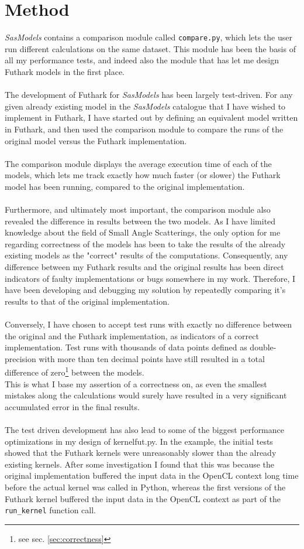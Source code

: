 \documentclass[11pt]{article}
\newcommand{\sasmodels}{\textit{SasModels}}
\begin{document}
\section{Method}
\sasmodels{} contains a comparison module called \texttt{compare.py}, which
lets the user run different calculations on the same dataset.
This module has been the basis of all my performance tests, and indeed also
the module that has let me design Futhark models in the first place.
\\\\
The development of Futhark for \sasmodels{} has been largely test-driven.
For any given already existing model in the \sasmodels{} catalogue that I have
wished to implement in Futhark, I have started out by defining an equivalent
model written in Futhark, and then used the comparison module to compare the
 runs of the original model versus the Futhark implementation.
\\\\
The comparison module displays the average execution time of each of the models,
which lets me track exactly how much faster (or slower) the Futhark model has
been running, compared to the original implementation.
\\\\
Furthermore, and ultimately most important, the comparison module also
revealed the difference in results between the two models. 
As I have limited knowledge about the field of Small Angle Scatterings, 
the only option for me regarding correctness of the models has been to take
the results of the already existing models as the "correct" results of the
computations. Consequently, any difference between my Futhark results and the
original results has been direct indicators of faulty implementations or bugs
somewhere in my work.
Therefore, I have been developing and debugging my solution by repeatedly
comparing it's results to that of the original implementation.
\\\\
Conversely, I have chosen to accept test runs with exactly no difference
between the original and the Futhark implementation, as indicators of a
correct implementation. 
Test runs with thousands of data points defined as double-precision
with more than ten decimal points have still resulted in a total difference of
zero\footnote{see sec. \ref{sec:correctness}} between the models.
\\
This is what I base my assertion of a correctness on, as even the smallest 
mistakes along the calculations would surely have resulted in a very significant
accumulated error in the final results.
\\\\
The test driven development has also lead to some of the biggest performance
optimizations in my design of kernelfut.py.
In the example, the initial tests showed that the Futhark kernels were unreasonably
slower than the already existing kernels. After some investigation I found
that this was because the original implementation buffered the input data in the
OpenCL context long time before the actual kernel was called in Python, whereas
the first versions of the Futhark kernel buffered the input data in the OpenCL
context as part of the \texttt{run\_kernel} function call.
\end{document}
